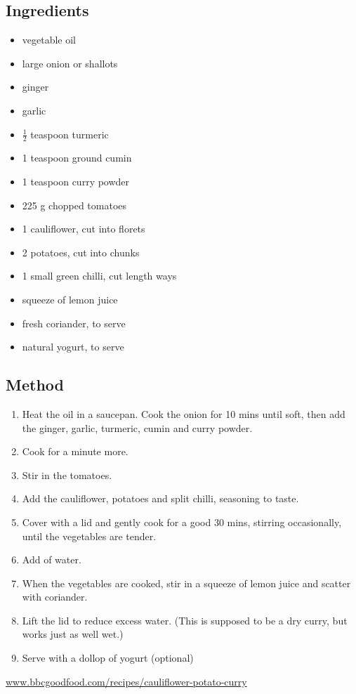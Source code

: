 \documentclass[11pt,a4paper]{article}
\begin{document}
\subsection*{Ingredients}

\begin{multicols}{2}

\begin{itemize}
  \item vegetable oil
  \item large onion or shallots
  \item ginger
  \item garlic
  \item $\frac {1} {2}$ teaspoon turmeric
  \item 1 teaspoon ground cumin
  \item 1 teaspoon curry powder
\end{itemize}

\columnbreak

\begin{itemize}
  \item 225 \si{\gram} chopped tomatoes
  \item 1 cauliflower, cut into florets
  \item 2 potatoes, cut into chunks
  \item 1 small green chilli, cut length ways
  \item squeeze of lemon juice
  \item fresh coriander, to serve
  \item natural yogurt, to serve
\end{itemize}

\end{multicols}

\medskip

\subsection*{Method}

\begin{enumerate}
  \item Heat the oil in a saucepan. Cook the onion for 10 mins until soft, then add the ginger, garlic, turmeric, cumin and curry powder.
  \item Cook for a minute more.
  \item Stir in the tomatoes.
  \item Add the cauliflower, potatoes and split chilli, seasoning to taste.
  \item Cover with a lid and gently cook for a good 30 mins, stirring occasionally, until the vegetables are tender.
  \item Add  of water.
  \item When the vegetables are cooked, stir in a squeeze of lemon juice and scatter with coriander.
  \item Lift the lid to reduce excess water. (This is supposed to be a dry curry, but works just as well wet.)
  \item Serve with a dollop of yogurt (optional)
\end{enumerate}

\href{https://www.bbcgoodfood.com/recipes/cauliflower-potato-curry}{www.bbcgoodfood.com/recipes/cauliflower-potato-curry}
\end{document}
